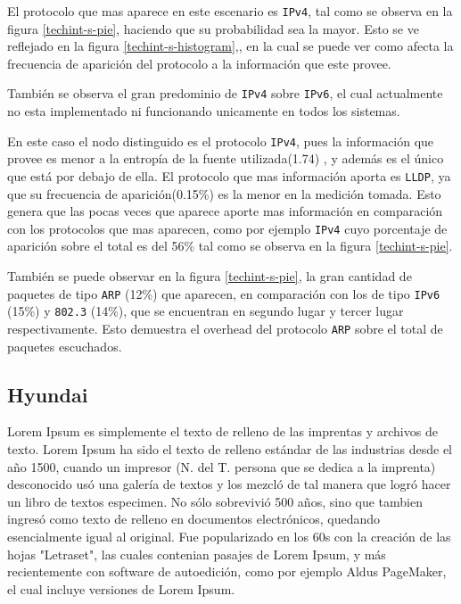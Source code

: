 \documentclass[final,narroweqnarray,inline]{ieee}
\begin{document}
    El protocolo que mas aparece en este escenario es \texttt{IPv4}, tal
    como se observa en la figura \ref{techint-s-pie}, haciendo que su probabilidad sea la
    mayor. Esto se ve reflejado en la figura \ref{techint-s-histogram},, en la cual se puede ver como
    afecta la frecuencia de aparición del protocolo a la información
    que este provee.

    También se observa el gran predominio de \texttt{IPv4} sobre \texttt{IPv6},
    el cual actualmente no esta implementado ni funcionando unicamente en todos
    los sistemas.

    En este caso el nodo distinguido es el protocolo \texttt{IPv4}, 
    pues la información que provee es menor a la entropía de la fuente 
    utilizada(1.74) , y además es el único que está por debajo de ella. El
    protocolo que mas información aporta es \texttt{LLDP}, ya que
    su frecuencia de aparición(0.15\%) es la menor en la medición tomada. Esto
    genera que las pocas veces que aparece aporte mas información en 
    comparación con los protocolos que mas aparecen, como por ejemplo 
    \texttt{IPv4} cuyo porcentaje de aparición sobre el total es del 56\%
    tal como se observa en la figura \ref{techint-s-pie}.

    También se puede observar en la figura \ref{techint-s-pie}, la gran cantidad de paquetes 
    de tipo \texttt{ARP} (12\%) que aparecen, en comparación con los
    de tipo \texttt{IPv6} (15\%) y \texttt{802.3} (14\%), que se encuentran
    en segundo lugar y tercer lugar respectivamente. Esto demuestra el overhead
    del protocolo \texttt{ARP} sobre el total de paquetes escuchados.

  \subsection{Hyundai}

Lorem Ipsum es simplemente el texto de relleno de las imprentas y archivos de texto. Lorem Ipsum ha sido el texto de relleno estándar de las industrias desde el año 1500, cuando un impresor (N. del T. persona que se dedica a la imprenta) desconocido usó una galería de textos y los mezcló de tal manera que logró hacer un libro de textos especimen. No sólo sobrevivió 500 años, sino que tambien ingresó como texto de relleno en documentos electrónicos, quedando esencialmente igual al original. Fue popularizado en los 60s con la creación de las hojas "Letraset", las cuales contenian pasajes de Lorem Ipsum, y más recientemente con software de autoedición, como por ejemplo Aldus PageMaker, el cual incluye versiones de Lorem Ipsum.
\end{document}
